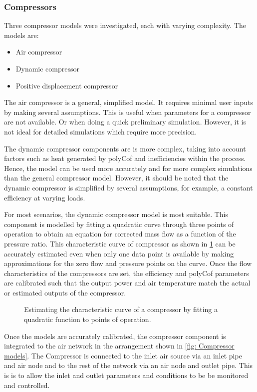 		\subsubsection{Compressors}
		Three compressor models were investigated, each with varying complexity. The models are:
		\begin{itemize}
			\item Air compressor
			\item Dynamic compressor 
			\item Positive displacement compressor
		\end{itemize}  
		The air compressor is a general, simplified model. It requires minimal user inputs by making several assumptions. This is useful when parameters for a compressor are not available. Or when doing a quick preliminary simulation. However, it is not ideal for detailed simulations which require more precision. 
		\par 
		The dynamic compressor components are is more complex, taking into account factors such as heat generated by \gls{polyCof} and inefficiencies within the process. Hence, the model can be used more accurately and for more complex simulations than the general compressor model. However, it should be noted that the dynamic compressor is simplified by several assumptions, for example, a constant efficiency at varying loads. 
		\par 	 
		For most scenarios, the dynamic compressor model is most suitable. This component is modelled by fitting a quadratic curve through three points of operation to obtain an equation for corrected mass flow as a function of the pressure ratio. This characteristic curve of compressor  as shown in \cref{fig: Compressor Curve} can be accurately estimated even when only one data point is available by making approximations for the zero flow and pressure points on the curve. Once the flow characteristics of the compressors are set, the efficiency and \gls{polyCof} parameters are calibrated such that the output power and air temperature match the actual or estimated outputs of the compressor.
		\begin{figure}[h]
			\centering
			\fbox{}
			\caption{Estimating the characteristic curve of a compressor by fitting a quadratic function to points of operation.}
			\label{fig: Compressor Curve}
		\end{figure}
		Once the models are accurately calibrated, the compressor component is integrated to the air network in the arrangement shown in \cref{fig: Compressor models}. The Compressor is connected to the inlet air source via an inlet pipe and air node and to the rest of the network via an air node and outlet pipe. This is is to allow the inlet and outlet parameters and conditions to be be monitored and controlled.
